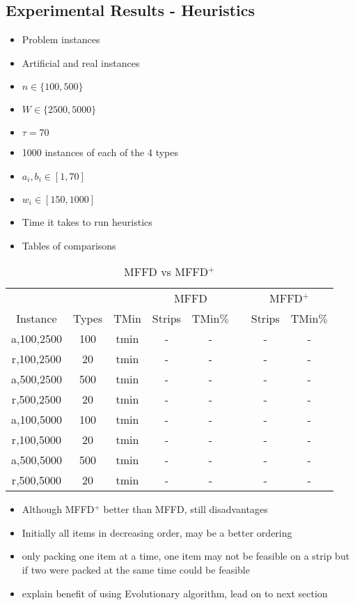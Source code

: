 \documentclass{elsarticle}
\begin{document}
\subsection{Experimental Results - Heuristics}
\begin{itemize}
	\item Problem instances
	\item Artificial and real instances
	\item $n \in \{100,500\}$
	\item $W \in \{2500,5000\}$
	\item $\tau = 70$
	\item 1000 instances of each of the 4 types
	\item $a_i, b_i \in [1,70]$
	\item $w_i \in [150,1000]$
	\item Time it takes to run heuristics
	\item Tables of comparisons
\end{itemize}

\begin{table}[h!]
	\centering
	\caption{MFFD vs MFFD$^+$}
	\begin{tabular}{cccccccc}\toprule
		& & &\multicolumn{2}{c}{MFFD} &\phantom{a}& \multicolumn{2}{c}{MFFD$^+$}\\
		\cmidrule{4-5} \cmidrule{7-8}
		Instance & Types &TMin & Strips & TMin$\%$ && Strips & TMin$\%$\\ \midrule	
		a,100,2500 & 100 & tmin & - & - && - & - \\
		r,100,2500 & 20 & tmin & - & - && - & -\\
		\midrule
		a,500,2500 & 500 & tmin & - & - && - & -\\
		r,500,2500 & 20 & tmin & - & - && - & -\\
		\midrule
		\midrule
		a,100,5000 & 100 & tmin & - & - && - & - \\
		r,100,5000 & 20 & tmin & - & - && - & -\\
		\midrule
		a,500,5000 & 500 & tmin & - & - && - & -\\
		r,500,5000 & 20 & tmin & - & - && - & -\\
		\bottomrule
	\end{tabular}	
	\label{table:MFFD}
\end{table}

\begin{itemize}
	\item Although MFFD$^+$ better than MFFD, still disadvantages
	\item Initially all items in decreasing order, may be a better ordering
	\item only packing one item at a time, one item may not be feasible on a strip but if two were packed at the same time could be feasible
	\item explain benefit of using Evolutionary algorithm, lead on to next section
\end{itemize}
\end{document}
